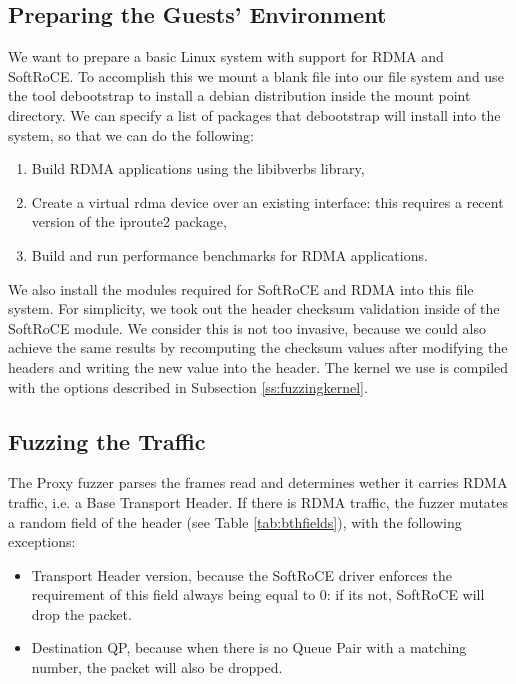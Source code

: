 \subsection{Preparing the Guests' Environment}

We want to prepare a basic Linux system with support for RDMA and SoftRoCE.
To accomplish this we mount a blank file into our file system and use the tool
debootstrap to install a debian distribution inside the mount point directory.
We can specify a list of packages that debootstrap will install into the system,
so that we can do the following:

\begin{enumerate}
  \item Build RDMA applications using the libibverbs library,
  \item Create a virtual rdma device over an existing interface: this requires a recent version of the iproute2 package,
  \item Build and run performance benchmarks for RDMA applications.
\end{enumerate}

We also install the modules required for SoftRoCE and RDMA into this file system.
For simplicity, we took out the header checksum validation inside of the SoftRoCE module. We consider
this is not too invasive, because we could also achieve the same results by recomputing the checksum values after modifying
the headers and writing the new value into the header.
The kernel we use is compiled with the options described in Subsection \ref{ss:fuzzingkernel}.

\subsection{Fuzzing the Traffic}

The Proxy fuzzer parses the frames read and determines wether it carries RDMA traffic, i.e. a Base Transport Header.
If there is RDMA traffic, the fuzzer mutates a random field of the header (see Table \ref{tab:bthfields}), with the following exceptions:

\begin{itemize}
  \item Transport Header version, because the SoftRoCE driver enforces the requirement of this field always being equal to 0: if its not, SoftRoCE will drop the packet.
  \item Destination QP, because when there is no Queue Pair with a matching number, the packet will also be dropped.
\end{itemize}

